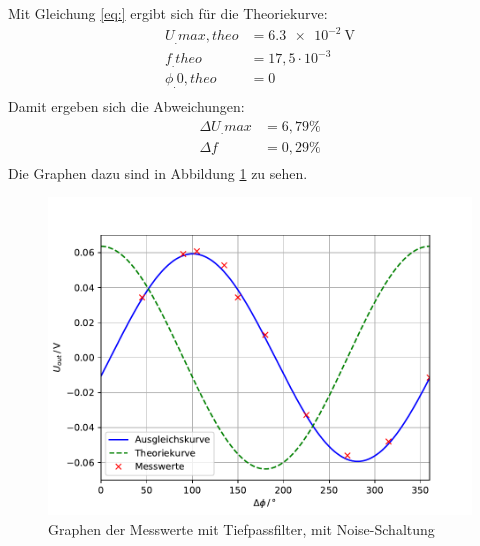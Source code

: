 Mit Gleichung \eqref{eq:} ergibt sich für die Theoriekurve:
\begin{align*}
U_.{max,theo} &= \SI{6,3e-2}{\volt} \\
f_.{theo}	  &= 17,5\cdot 10^{-3} \\
\phi_.{0,theo}&= 0 \\
\end{align*}
Damit ergeben sich die Abweichungen:
\begin{align*}
\Delta U_.{max} &= 6,79\% \\
\Delta f		&= 0,29\% \\
\end{align*}
Die Graphen dazu sind in Abbildung \ref{fig:U4} zu sehen.
\begin{figure}
\centering
\includegraphics[scale=0.5]{content/images/plot2.pdf}
\caption{Graphen der Messwerte mit Tiefpassfilter, mit Noise-Schaltung}\label{fig:U4}
\end{figure}
